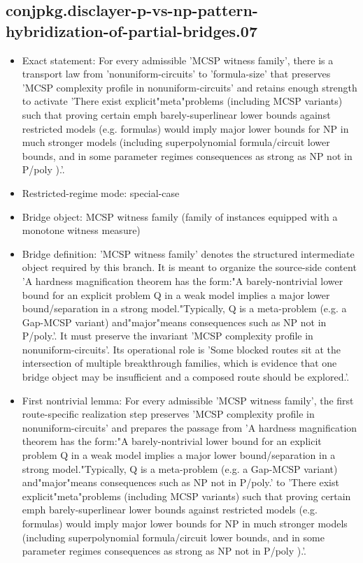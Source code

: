 \documentclass[11pt]{article}
\begin{document}
\subsection*{conjpkg.disclayer-p-vs-np-pattern-hybridization-of-partial-bridges.07}
\begin{itemize}
\item Exact statement: For every admissible 'MCSP witness family', there is a transport law from 'nonuniform-circuits' to 'formula-size' that preserves 'MCSP complexity profile in nonuniform-circuits' and retains enough strength to activate 'There exist explicit"meta"problems (including MCSP variants) such that proving certain emph barely-superlinear lower bounds against restricted models (e.g. formulas) would imply major lower bounds for NP in much stronger models (including superpolynomial formula/circuit lower bounds, and in some parameter regimes consequences as strong as NP not in P/poly ).'.
\item Restricted-regime mode: special-case
\item Bridge object: MCSP witness family (family of instances equipped with a monotone witness measure)
\item Bridge definition: 'MCSP witness family' denotes the structured intermediate object required by this branch. It is meant to organize the source-side content 'A hardness magnification theorem has the form:"A barely-nontrivial lower bound for an explicit problem Q in a weak model implies a major lower bound/separation in a strong model."Typically, Q is a meta-problem (e.g. a Gap-MCSP variant) and"major"means consequences such as NP not in P/poly.'. It must preserve the invariant 'MCSP complexity profile in nonuniform-circuits'. Its operational role is 'Some blocked routes sit at the intersection of multiple breakthrough families, which is evidence that one bridge object may be insufficient and a composed route should be explored.'.
\item First nontrivial lemma: For every admissible 'MCSP witness family', the first route-specific realization step preserves 'MCSP complexity profile in nonuniform-circuits' and prepares the passage from 'A hardness magnification theorem has the form:"A barely-nontrivial lower bound for an explicit problem Q in a weak model implies a major lower bound/separation in a strong model."Typically, Q is a meta-problem (e.g. a Gap-MCSP variant) and"major"means consequences such as NP not in P/poly.' to 'There exist explicit"meta"problems (including MCSP variants) such that proving certain emph barely-superlinear lower bounds against restricted models (e.g. formulas) would imply major lower bounds for NP in much stronger models (including superpolynomial formula/circuit lower bounds, and in some parameter regimes consequences as strong as NP not in P/poly ).'.

\end{itemize}
\end{document}
